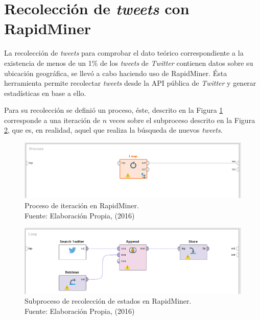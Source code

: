 

\section{Recolección de \textit{tweets} con RapidMiner}
\label{apendice:apendice1}

La recolección de \textit{tweets} para comprobar el dato teórico correspondiente a la existencia de menos de un 1\% de los \textit{tweets} de \textit{Twitter} contienen datos sobre su ubicación geográfica, se llevó a cabo haciendo uso de RapidMiner. Ésta herramienta permite recolectar \textit{tweets} desde la API pública de \textit{Twitter} y generar estadísticas en base a ello.

Para su recolección se definió un proceso, éste, descrito en la Figura \ref{fig:RMP} corresponde a una iteración de $n$ veces sobre el subproceso descrito en la Figura \ref{fig:RMSP}, que es, en realidad, aquel que realiza la búsqueda de nuevos \textit{tweets}.

\begin{figure}[H]
        \centering
        \captionsetup{justification=centering}
        \includegraphics[scale=0.8]{images/RMProcess.png}
        \caption[Proceso de iteración en RapidMiner.]{Proceso de iteración en RapidMiner.\\Fuente: Elaboración Propia, (2016)}
        \label{fig:RMP}
\end{figure}

\begin{figure}[H]
        \centering
        \captionsetup{justification=centering}
        \includegraphics[scale=0.8]{images/RMSProcess.png}
        \caption[Subproceso de recolección de estados en RapidMiner.]{Subproceso de recolección de estados en RapidMiner.\\Fuente: Elaboración Propia, (2016)}
        \label{fig:RMSP}
\end{figure}

